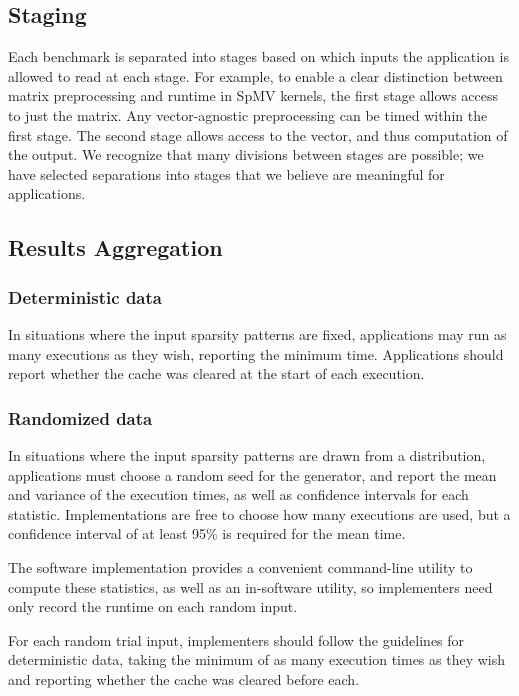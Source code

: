 \documentclass{article}
\begin{document}
\subsection{Staging}

Each benchmark is separated into stages based on which inputs the application is allowed to read at each stage. For example, to enable a clear distinction between matrix preprocessing and runtime in SpMV kernels, the first stage allows access to just the matrix. Any vector-agnostic preprocessing can be timed within the first stage. The second stage allows access to the vector, and thus computation of the output. We recognize that many divisions between stages are possible; we have selected separations into stages that we believe are meaningful for applications.

\subsection{Results Aggregation}

\subsubsection{Deterministic data}

    In situations where the input sparsity patterns are fixed, applications may run as many executions as they wish, reporting the minimum time. Applications should report whether the cache was cleared at the start of each execution.

\subsubsection{Randomized data}

    In situations where the input sparsity patterns are drawn from a distribution, applications must choose a random seed for the generator, and report the mean and variance of the execution times, as well as confidence intervals for each statistic. Implementations are free to choose how many executions are used, but a confidence interval of at least 95\% is required for the mean time.

    The software implementation provides a convenient command-line utility to compute these statistics, as well as an in-software utility, so implementers need only record the runtime on each random input.

    For each random trial input, implementers should follow the guidelines for deterministic data, taking the minimum of as many execution times as they wish and reporting whether the cache was cleared before each.
\end{document}
